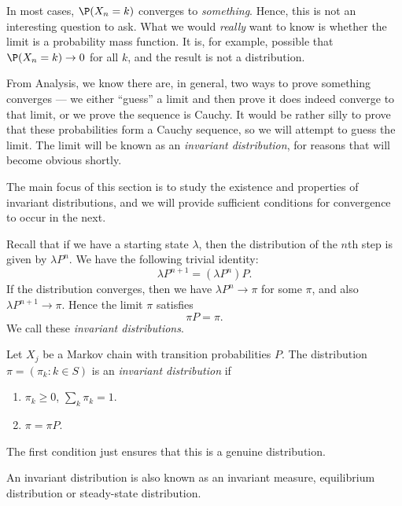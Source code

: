 \documentclass[a4paper]{article}
\begin{document}
In most cases, $\P(X_n = k)$ converges to \emph{something}. Hence, this is not an interesting question to ask. What we would \emph{really} want to know is whether the limit is a probability mass function. It is, for example, possible that $\P(X_n = k) \to 0$ for all $k$, and the result is not a distribution.

From Analysis, we know there are, in general, two ways to prove something converges --- we either ``guess'' a limit and then prove it does indeed converge to that limit, or we prove the sequence is Cauchy. It would be rather silly to prove that these probabilities form a Cauchy sequence, so we will attempt to guess the limit. The limit will be known as an \emph{invariant distribution}, for reasons that will become obvious shortly.

The main focus of this section is to study the existence and properties of invariant distributions, and we will provide sufficient conditions for convergence to occur in the next.

Recall that if we have a starting state $\lambda$, then the distribution of the $n$th step is given by $\lambda P^n$. We have the following trivial identity:
\[
  \lambda P^{n + 1} = (\lambda P^n) P.
\]
If the distribution converges, then we have $\lambda P^n \to \pi$ for some $\pi$, and also $\lambda P^{n + 1} \to \pi$. Hence the limit $\pi$ satisfies
\[
  \pi P = \pi.
\]
We call these \emph{invariant distributions}.

\begin{defi}
  Let $X_j$ be a Markov chain with transition probabilities $P$. The distribution $\pi = (\pi_k: k \in S)$ is an \emph{invariant distribution} if
  \begin{enumerate}
    \item $\pi_k \geq 0$, $\sum_k \pi_k = 1$.
    \item $\pi = \pi P$.
  \end{enumerate}
  The first condition just ensures that this is a genuine distribution.

  An invariant distribution is also known as an invariant measure, equilibrium distribution or steady-state distribution.
\end{defi}
\end{document}

